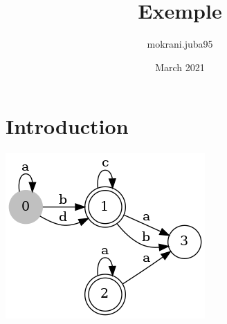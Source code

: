 \documentclass{article}
\title{Exemple}
\author{mokrani.juba95 }
\date{March 2021}
\begin{document}
    \maketitle
    \section{Introduction}
    \includegraphics[scale=1.5]{file}
\end{document}
